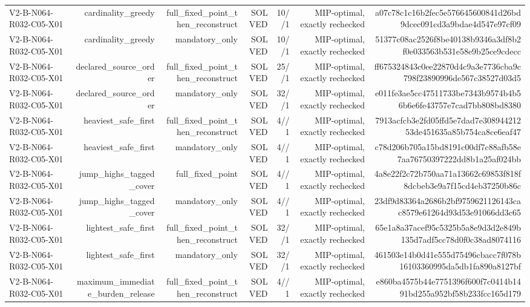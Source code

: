 {\begin{longtable}{lrrrrrr}
V2-B-N064-R032-C05-X01 & cardinality\_greedy & full\_fixed\_point\_then\_reconstruct & SOLVED & 10//1 & MIP-optimal, exactly rechecked & a07c78c1c16b2fec5e576645600841d26bd9dcec091cd3a9bdae4d547e97cf09 \\
V2-B-N064-R032-C05-X01 & cardinality\_greedy & mandatory\_only & SOLVED & 10//1 & MIP-optimal, exactly rechecked & 51377c08ac2526f8be40138b9346a3df8b2f0e033563b531e58e9b25ce9cdecc \\
V2-B-N064-R032-C05-X01 & declared\_source\_order & full\_fixed\_point\_then\_reconstruct & SOLVED & 25//1 & MIP-optimal, exactly rechecked & ff675324843c0ee22870d4c9a3e7736cba9c798f23890996de567c38527d03d5 \\
V2-B-N064-R032-C05-X01 & declared\_source\_order & mandatory\_only & SOLVED & 32//1 & MIP-optimal, exactly rechecked & e011fe3ae5cc47511733be7343b9574b4b56b6e6fe43757e7cad7bb808bd8380 \\
V2-B-N064-R032-C05-X01 & heaviest\_safe\_first & full\_fixed\_point\_then\_reconstruct & SOLVED & 4//1 & MIP-optimal, exactly rechecked & 7913acfcb3e2fd05ffd5e7dad7e30894421253de451635a85b754ca8ce6eaf47 \\
V2-B-N064-R032-C05-X01 & heaviest\_safe\_first & mandatory\_only & SOLVED & 4//1 & MIP-optimal, exactly rechecked & c78d206b705a15bd8191c00df7c88afb58e7aa76750397222dd8b1a25af024bb \\
V2-B-N064-R032-C05-X01 & jump\_highs\_tagged\_cover & full\_fixed\_point & SOLVED & 4//1 & MIP-optimal, exactly rechecked & 4a8e22f2c72b750aa71a13662c69853f818f8dcbeb3e9a7f15cd4eb37250b86c \\
V2-B-N064-R032-C05-X01 & jump\_highs\_tagged\_cover & mandatory\_only & SOLVED & 4//1 & MIP-optimal, exactly rechecked & 23df9d83364a2686b2bf9759621126143cac8579e61264d93d53e91066dd3c65 \\
V2-B-N064-R032-C05-X01 & lightest\_safe\_first & full\_fixed\_point\_then\_reconstruct & SOLVED & 32//1 & MIP-optimal, exactly rechecked & 65e1a8a37acef95c5325b5a8e9d3d2e849b135d7adf5cc78d0f0c38ad8074116 \\
V2-B-N064-R032-C05-X01 & lightest\_safe\_first & mandatory\_only & SOLVED & 32//1 & MIP-optimal, exactly rechecked & 461503e14b0d41e555d75496cbacc7f078b16103360995da5db1fa890a8127bf \\
V2-B-N064-R032-C05-X01 & maximum\_immediate\_burden\_release & full\_fixed\_point\_then\_reconstruct & SOLVED & 4//1 & MIP-optimal, exactly rechecked & e860ba4575b44e7751396f600f7c0414b1491bd255a952bf58b233fcc165d179 \\

\end{longtable}}
